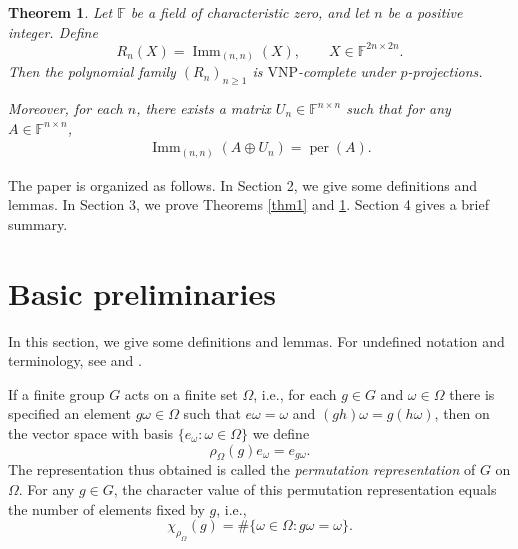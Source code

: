 \documentclass[11pt,a4paper]{article}
\newtheorem{theorem}{Theorem}[section]
\begin{document}
\begin{theorem}\label{thm2}
Let $\mathbb{F}$ be a field of characteristic zero, and let $n$ be a positive integer. Define
\[
  R_n(X)=\operatorname{Imm}_{(n,n)}(X),
  \qquad X\in\mathbb{F}^{2n\times 2n}.
\]
Then the polynomial family $(R_n)_{n\geq 1}$ is $\mathrm{VNP}$-complete under $p$-projections.

Moreover, for each $n$, there exists a matrix $U_n\in\mathbb{F}^{n\times n}$ such that for any $A\in\mathbb{F}^{n\times n}$,
\begin{eqnarray*}
  \operatorname{Imm}_{(n,n)}(A\oplus U_n)=\operatorname{per}(A).
\end{eqnarray*}
\end{theorem}

The paper is organized as follows. In Section 2, we give some definitions and lemmas. In Section 3, we prove Theorems \ref{thm1} and \ref{thm2}. Section 4 gives a brief  summary.


\section{Basic preliminaries}

In this section, we give some definitions and lemmas. For undefined notation and terminology, see \cite{jam} and \cite{sag}.

If a finite group $G$ acts on a finite set $\Omega$, i.e., for each $g\in G$ and $\omega\in\Omega$ there is specified an element $g\omega\in\Omega$ such that $e\omega=\omega$ and $(gh)\omega=g(h\omega)$, then on the vector space with basis $\{e_\omega:\omega\in\Omega\}$ we define
\[
  \rho_\Omega(g)e_\omega=e_{g\omega}.
\]
The representation thus obtained is called the {\em permutation representation} of $G$ on $\Omega$. For any $g\in G$, the character value of this permutation representation equals the number of elements fixed by $g$, i.e.,
\[
  \chi_{\rho_\Omega}(g)
  =\#\{\omega\in\Omega:g\omega=\omega\}.
\]
\end{document}
